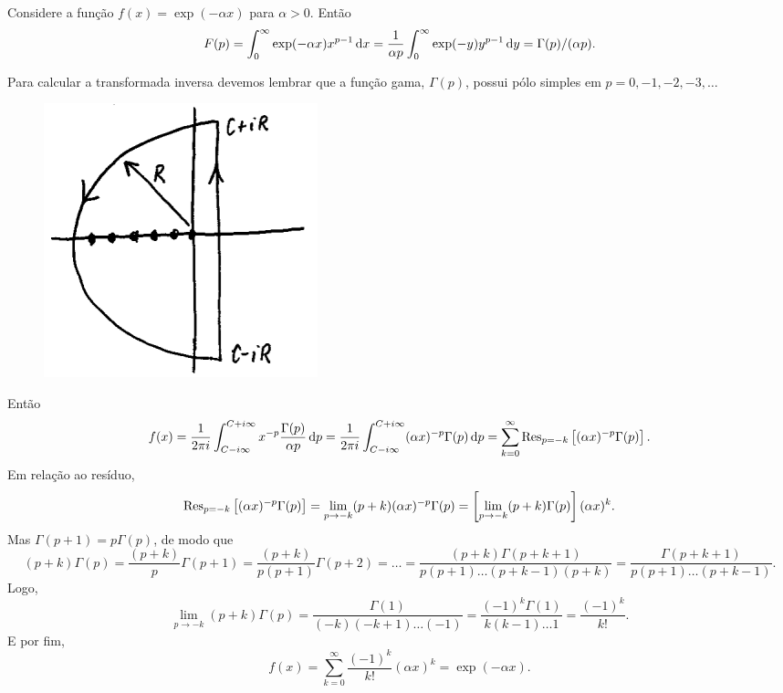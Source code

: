 \begin{exem}
  Considere a função $f(x) = \exp(-\alpha x)$ para $\alpha > 0$. Então
  \begin{dmath*}
    F(p) = \int_{0}^{\infty} \exp(-\alpha x) x^{p - 1} \vi{x}
    = \frac{1}{\alpha p} \int_{0}^{\infty} \exp(-y) y^{p - 1} \vi{y}
    = \Gamma(p) / (\alpha p).
  \end{dmath*}

  Para calcular a transformada inversa devemos lembrar que a função gama,
  $\Gamma(p)$, possui pólo simples em $p = 0, -1, -2, -3, \ldots$
  \begin{figure}[htb]
    \centering
    \includegraphics{figuras/15-0}
  \end{figure}
  Então
  \begin{dmath*}
    f(x) = \frac{1}{2 \pi i} \int_{C - i \infty}^{C + i \infty} x^{-p}
    \frac{\Gamma(p)}{\alpha p} \vi{p}
    = \frac{1}{2 \pi i} \int_{C - i \infty}^{C + i \infty} (\alpha x)^{-p}
    \Gamma(p) \vi{p}
    = \sum_{k = 0}^{\infty} \Res_{p = -k}\left[ (\alpha x)^{-p} \Gamma(p)
    \right].
  \end{dmath*}
  Em relação ao resíduo,
  \begin{dmath*}
    \Res_{p = -k}\left[ (\alpha x)^{-p} \Gamma(p) \right] = \lim_{p \to -k} (p +
    k) (\alpha x)^{-p} \Gamma(p)
    = \left[ \lim_{p \to -k} (p + k) \Gamma(p) \right] (\alpha x)^k.
  \end{dmath*}
  Mas $\Gamma(p + 1) = p \Gamma(p)$, de modo que
  \begin{dmath*}
    (p + k) \Gamma(p) = \frac{(p + k)}{p} \Gamma(p + 1)
    = \frac{(p + k)}{p (p + 1)} \Gamma(p + 2)
    = \ldots
    = \frac{(p + k) \Gamma(p + k + 1)}{p (p + 1) \ldots (p + k - 1) (p + k)}
    = \frac{\Gamma(p + k + 1)}{p (p + 1) \ldots (p + k - 1)}.
  \end{dmath*}
  Logo,
  \begin{dmath*}
    \lim_{p \to -k} (p + k) \Gamma(p) = \frac{\Gamma(1)}{(-k) (-k + 1) \ldots
    (-1)}
    = \frac{(-1)^{k} \Gamma(1)}{k (k - 1) \ldots 1}
    = \frac{(-1)^k}{k!}.
  \end{dmath*}
  E por fim,
  \begin{dmath*}
    f(x) = \sum_{k = 0}^{\infty} \frac{(-1)^k}{k!} (\alpha x)^k
    = \exp(-\alpha x).
  \end{dmath*}
\end{exem}

